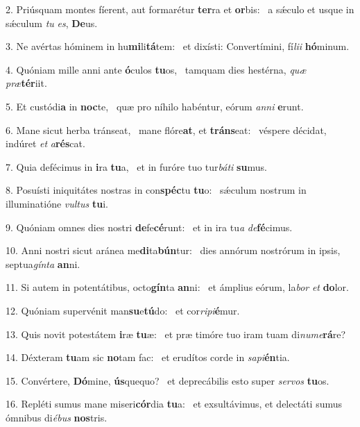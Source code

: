2. Priúsquam montes fíerent, aut formarétur \textbf{ter}ra et \textbf{or}bis: \ast\  a sǽculo et usque in sǽculum \textit{tu} \textit{es}, \textbf{De}us.\

3. Ne avértas hóminem in hu\textbf{mi}li\textbf{tá}tem: \ast\  et dixísti: Convertímini, fí\textit{li}\textit{i} \textbf{hó}minum.\

4. Quóniam mille anni ante \textbf{ó}culos \textbf{tu}os, \ast\  tamquam dies hestérna, \textit{quæ} \textit{præ}\textbf{tér}iit.\

5. Et custódi\textbf{a} in \textbf{noc}te, \ast\  quæ pro níhilo habéntur, eórum \textit{an}\textit{ni} \textbf{e}runt.\

6. Mane sicut herba tránseat, \dag\  mane flóre\textbf{at}, et \textbf{tráns}eat: \ast\  véspere décidat, indúret \textit{et} \textit{a}\textbf{rés}cat.\

7. Quia defécimus in \textbf{i}ra \textbf{tu}a, \ast\  et in furóre tuo tur\textit{bá}\textit{ti} \textbf{su}mus.\

8. Posuísti iniquitátes nostras in con\textbf{spéc}tu \textbf{tu}o: \ast\  sǽculum nostrum in illuminatióne \textit{vul}\textit{tus} \textbf{tu}i.\

9. Quóniam omnes dies nostri \textbf{de}fe\textbf{cé}runt: \ast\  et in ira tu\textit{a} \textit{de}\textbf{fé}cimus.\

10. Anni nostri sicut aránea me\textbf{di}ta\textbf{bún}tur: \ast\  dies annórum nostrórum in ipsis, septua\textit{gín}\textit{ta} \textbf{an}ni.\

11. Si autem in potentátibus, octo\textbf{gín}ta \textbf{an}ni: \ast\  et ámplius eórum, la\textit{bor} \textit{et} \textbf{do}lor.\

12. Quóniam supervénit man\textbf{su}e\textbf{tú}do: \ast\  et cor\textit{ri}\textit{pi}\textbf{é}mur.\

13. Quis novit potestátem \textbf{i}ræ \textbf{tu}æ: \ast\  et præ timóre tuo iram tuam di\textit{nu}\textit{me}\textbf{rá}re?\

14. Déxteram \textbf{tu}am sic \textbf{no}tam fac: \ast\  et erudítos corde in \textit{sa}\textit{pi}\textbf{én}tia.\

15. Convértere, \textbf{Dó}mine, \textbf{ús}quequo? \ast\  et deprecábilis esto super \textit{ser}\textit{vos} \textbf{tu}os.\

16. Repléti sumus mane miseri\textbf{cór}dia \textbf{tu}a: \ast\  et exsultávimus, et delectáti sumus ómnibus di\textit{é}\textit{bus} \textbf{nos}tris.\

